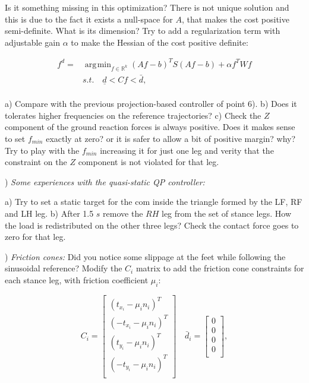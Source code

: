\documentclass{report}
\newcommand{\Rnum}{\mathbb{R}} %
\DeclareMathOperator*{\argmin}{\arg\!\min}				%
\begin{document}
Is it something missing in this optimization? There is not unique solution and this is due to the fact it exists a null-space  for $A$, that makes the cost positive semi-definite. What is its dimension?  Try to add a regularization term with adjustable gain $\alpha$ to make the 
Hessian of the cost positive definite:

\begin{equation} 
\begin{aligned} 
f^d = & \argmin_{f \in \Rnum^k} (Af-b)^T S (Af-b) + \alpha f^T W f\\
& s.t. \quad \underline{d} < C f < \bar{d},\\
\end{aligned} 
\label{eq:min_prob}
\end{equation}

a) Compare with the previous projection-based controller of point 6). 
b) Does it tolerates higher frequencies on the reference trajectories?
c) Check the $Z$ component of the ground reaction forces is always positive. Does it makes sense to set $f_{min}$ exactly at zero? or it is safer to allow a bit of positive margin? why?
 Try to play with the $f_{min}$ increasing it for just one leg and verity that the constraint on the $Z$ component is not violated for that leg.

\quad

) \textit{Some experiences with the quasi-static QP controller:}

a) Try to set a static target for the com inside the triangle formed by the LF, RF and LH leg.
b) After 1.5 $s$ remove the  $RH$ leg from the set of stance legs. How the load is redistributed on the other three legs? Check the contact force goes to zero for that leg.

\quad

) \textit{Friction cones:}
Did you notice  some slippage at the feet while following the sinusoidal reference?
Modify the $C_i$ matrix to add the friction cone constraints for each stance leg, with friction coefficient $\mu_i$:

\begin{equation}
C_i = \left[ \begin{matrix} 
(t_{x_i} -\mu_i n_i)^T \\
(-t_{x_i} -\mu_i n_i)^T \\
(t_{y_i} -\mu_i n_i)^T \\
(-t_{y_i} -\mu_i n_i)^T \\
\end{matrix}\right] 
\quad
\bar{d}_i = \left[ \begin{matrix} 
0 \\
0 \\ 
0 \\
0\\
\end{matrix}\right],
\label{eq:inequality_matrix}
\end{equation}
\end{document}
